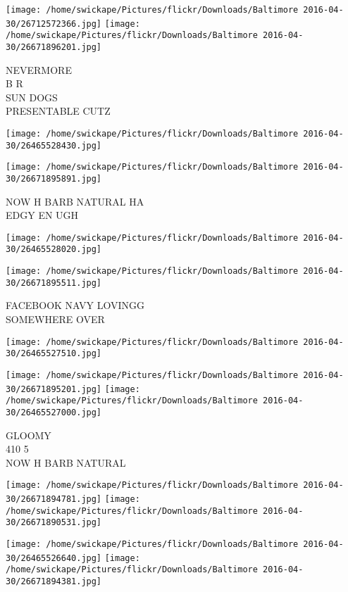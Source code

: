 \documentclass[10pt,letterpaper]{article}
\begin{document}
\texttt{[image: /home/swickape/Pictures/flickr/Downloads/Baltimore 2016-04-30/26712572366.jpg]}
\texttt{[image: /home/swickape/Pictures/flickr/Downloads/Baltimore 2016-04-30/26671896201.jpg]}

NEVERMORE\\
B R\\
SUN DOGS\\
PRESENTABLE CUTZ\\
\pagebreak

\texttt{[image: /home/swickape/Pictures/flickr/Downloads/Baltimore 2016-04-30/26465528430.jpg]}

\vspace{0.25in}
\texttt{[image: /home/swickape/Pictures/flickr/Downloads/Baltimore 2016-04-30/26671895891.jpg]}

NOW H BARB NATURAL HA\\
EDGY EN UGH\\
\pagebreak

\texttt{[image: /home/swickape/Pictures/flickr/Downloads/Baltimore 2016-04-30/26465528020.jpg]}

\vspace{0.25in}
\texttt{[image: /home/swickape/Pictures/flickr/Downloads/Baltimore 2016-04-30/26671895511.jpg]}

FACEBOOK NAVY LOVINGG\\
SOMEWHERE OVER\\
\pagebreak

\texttt{[image: /home/swickape/Pictures/flickr/Downloads/Baltimore 2016-04-30/26465527510.jpg]}

\vspace{0.25in}
\texttt{[image: /home/swickape/Pictures/flickr/Downloads/Baltimore 2016-04-30/26671895201.jpg]}
\texttt{[image: /home/swickape/Pictures/flickr/Downloads/Baltimore 2016-04-30/26465527000.jpg]}

GLOOMY\\
410 5\\
NOW H BARB NATURAL\\
\pagebreak

\texttt{[image: /home/swickape/Pictures/flickr/Downloads/Baltimore 2016-04-30/26671894781.jpg]}
\texttt{[image: /home/swickape/Pictures/flickr/Downloads/Baltimore 2016-04-30/26671890531.jpg]}

\texttt{[image: /home/swickape/Pictures/flickr/Downloads/Baltimore 2016-04-30/26465526640.jpg]}
\texttt{[image: /home/swickape/Pictures/flickr/Downloads/Baltimore 2016-04-30/26671894381.jpg]}
\end{document}

